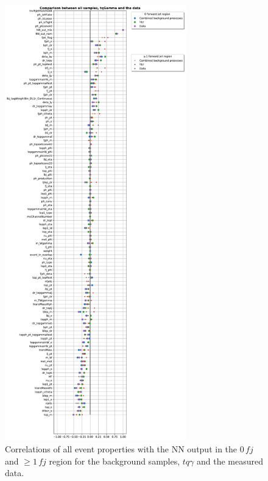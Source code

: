 \begin{figure}[htbp]
    \centering
    \includegraphics[width=0.7\textwidth]{Plots/corrAll.pdf}
    \caption{Correlations of all event properties with the NN output in the $0\,fj$ and $\geq 1\,fj$ region for the background samples, $tq\gamma$ and the measured data.}
    \label{fig:corrAll}
\end{figure}